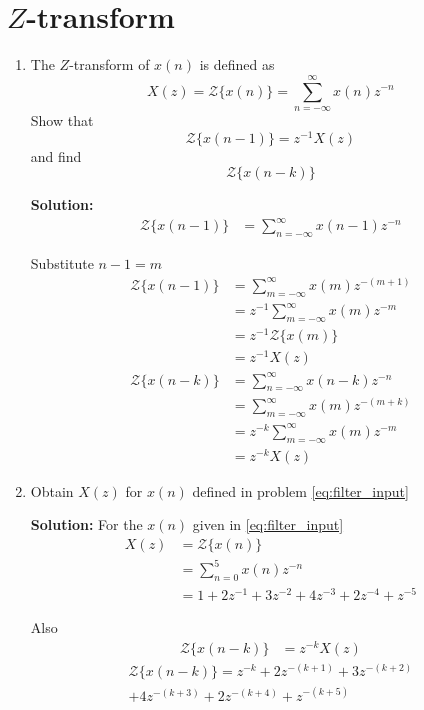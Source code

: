 \documentclass[journal,12pt,twocolumn]{IEEEtran}
\newcommand{\solution}{\noindent \textbf{Solution: }}
\providecommand{\z}[1]{{\mathcal{Z}}\{#1\}}
\numberwithin{equation}{section}
\renewcommand\thesection{\arabic{section}}
\begin{document}
	\section{$Z$-transform}
	\begin{enumerate}[label=\thesection.\arabic*]
	\item The $Z$-transform of $x(n)$ is defined as
	\begin{equation}
		\label{eq:z_trans}
		X(z)={\mathcal {Z}}\{x(n)\}=\sum _{n=-\infty }^{\infty }x(n)z^{-n}
	\end{equation}
	Show that
	\begin{equation}
		\label{eq:shift1}
		{\mathcal {Z}}\{x(n-1)\} = z^{-1}X(z)
	\end{equation}
	and find
	\begin{equation}
		{\mathcal {Z}}\{x(n-k)\} 
	\end{equation}
	
	\solution 
	\begin{align}
		{\mathcal {Z}}\{x(n-1)\} &= \sum _{n=-\infty }^{\infty }x(n - 1)z^{-n} 
	\end{align}
	
	Substitute $n - 1 = m$
	\begin{align}
		{\mathcal {Z}}\{x(n-1)\} &=  \sum _{m=-\infty }^{\infty }x(m)z^{-(m+1)} \\
		&= z^{-1} \sum _{m=-\infty }^{\infty }x(m)z^{-m} \\
		&= z^{-1} {\mathcal {Z}}\{x(m)\} \\	
		&= z^{-1} X(z) \\
		{\mathcal {Z}}\{x(n-k)\} &=  \sum _{n=-\infty }^{\infty }x(n - k)z^{-n} \\
		&=  \sum _{m=-\infty }^{\infty }x(m)z^{-(m+k)} \\
		&= z^{-k} \sum _{m=-\infty }^{\infty }x(m)z^{-m} \\
		&= z^{-k} X(z)
	\end{align}	
	
	\item Obtain $X(z)$ for $x(n)$ defined in problem \ref{eq:filter_input}
	
	\solution For the $x(n)$ given in \eqref{eq:filter_input}
	\begin{align}
		X(z) &= \z{x(n)} \\
		&= \sum _{n=0}^{5}x(n)z^{-n} \\
		&= 1 + 2z^{-1} + 3z^{-2} + 4z^{-3} + 2z^{-4} + z^{-5}
	\end{align}
	
	Also
	\begin{align}
		\z{x(n-k)} &= z^{-k} X(z)
	\end{align}
	\begin{multline}
		\z{x(n-k)} = z^{-k} + 2z^{-(k+1)} + 3z^{-(k+2)} \\+ 4z^{-(k+3)} + 2z^{-(k+4)} + z^{-(k+5)}
	\end{multline}
	

\end{enumerate}
\end{document}
